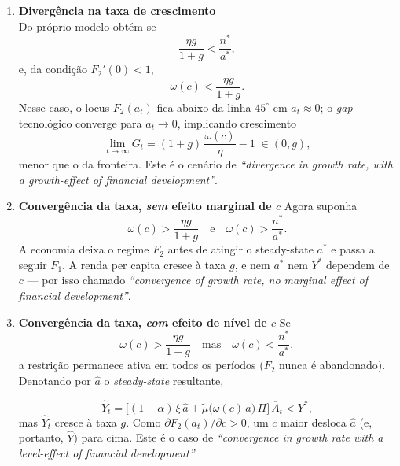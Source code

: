 \documentclass[a4paper,12pt]{article}[abntex2]
\begin{document}
\begin{enumerate}
\item \textbf{Divergência na taxa de crescimento}\\[2pt]
      Do próprio modelo obtém-se  
      \[
          \frac{\eta g}{1+g} < \frac{n^{\ast}}{a^{\ast}}, 
          \tag{21}
      \]
      e, da condição $F_{2}'(0)<1$,
      \[
          \omega(c) < \frac{\eta g}{1+g}. 
          \tag{22}
      \]
      Nesse caso, o locus $F_{2}(a_t)$ fica
      abaixo da linha $45^{\circ}$ em $a_t\approx0$;
      o \emph{gap} tecnológico converge para $a_t\to0$,
      implicando crescimento
      \[
          \lim_{t\to\infty} G_t
            =(1+g)\,\frac{\omega(c)}{\eta}-1\;\in(0,g),
      \]
      menor que o da fronteira.  
      Este é o cenário de  
      \emph{``divergence in growth rate, with a growth-effect of financial development''}.

\item \textbf{Convergência da taxa, \emph{sem} efeito marginal de $c$}
      Agora suponha
      \[
          \omega(c)>\frac{\eta g}{1+g}
          \quad\text{e}\quad
          \omega(c)>\frac{n^{\ast}}{a^{\ast}}.
          \tag{23–24}
      \]
      A economia deixa o regime $F_{2}$ antes de atingir
      o steady-state $a^{\ast}$ e passa a seguir $F_{1}$.
      A renda per capita cresce à
      taxa $g$, e nem $a^{\ast}$ nem $Y^{\ast}$ dependem
      de $c$ — por isso chamado
      \emph{``convergence of growth rate, no marginal effect of financial development''}.

\item \textbf{Convergência da taxa, \emph{com} efeito de nível de $c$}
      Se
      \[
          \omega(c)>\frac{\eta g}{1+g}
          \quad\text{mas}\quad
          \omega(c)<\frac{n^{\ast}}{a^{\ast}},
          \tag{25}
      \]
      a restrição permanece ativa em todos os períodos
      ($F_{2}$ nunca é abandonado).  
      Denotando por $\hat{a}$ o \emph{steady-state} resultante,

      \[
          \hat{Y}_t
            =\bigl[(1-\alpha)\,\xi\,\hat{a}
                   +\tilde{\mu}\!\bigl(\omega(c)\,\hat{a}\bigr)\,\Pi\bigr]\,
              \overline{A}_t
            < Y^{\ast},
          \tag{26}
      \]
      mas $\hat{Y}_t$ cresce à taxa $g$.  
      Como $\partial F_{2}(a_t)/\partial c>0$,
      um $c$ maior desloca $\hat{a}$ (e, portanto, $\hat{Y}$)
      para cima.  
      Este é o caso de  
      \emph{``convergence in growth rate with a level-effect of financial development''}.
\end{enumerate}
\end{document}
